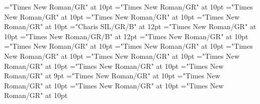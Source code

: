 \documentclass[gps1,twoside]{article}
\begin{document}
\font\variantentrytypevariantentrytypevariantentrytypesvisiblevariantentryrefvisiblevariantentryrefsminorentrycomplexbefore="Times New Roman/GR" at 10pt
\font\variantentrytypesvisiblevariantentryrefvisiblevariantentryrefsminorentrycomplexafter="Times New Roman/GR" at 10pt
\font\spanspanabbreviationvariantentrytypevariantentrytypesvisiblevariantentryrefvisiblevariantentryrefsminorentrycomplexbefore="Times New Roman/GR" at 10pt
\font\spanabbreviationvariantentrytypevariantentrytypesvisiblevariantentryrefvisiblevariantentryrefsminorentrycomplexlastchildafter="Times New Roman/GR" at 10pt
\font{}="Times New Roman/GR" at 10pt
\font\spanbzhheadwordreferencedentryreferencedentriesvisiblevariantentryrefvisiblevariantentryrefsminorentrycomplex="Charis SIL/GR/B" at 12pt
\font\spanspanheadwordreferencedentryreferencedentriesvisiblevariantentryrefvisiblevariantentryrefsminorentrycomplexbefore="Times New Roman/GR" at 10pt
\font\spanheadwordreferencedentryreferencedentriesvisiblevariantentryrefvisiblevariantentryrefsminorentrycomplex="Times New Roman/GR/B" at 12pt
\font\spanspandefinitionorglossreferencedentryreferencedentriesvisiblevariantentryrefvisiblevariantentryrefsminorentrycomplexbefore="Times New Roman/GR" at 10pt
\font\spandefinitionorglossreferencedentryreferencedentriesvisiblevariantentryrefvisiblevariantentryrefsminorentrycomplexfirstchildbefore="Times New Roman/GR" at 10pt
\font\spanspansummaryvisiblevariantentryrefvisiblevariantentryrefsminorentrycomplexbefore="Times New Roman/GR" at 10pt
\font\spansummaryvisiblevariantentryrefvisiblevariantentryrefsminorentrycomplexfirstchildbefore="Times New Roman/GR" at 10pt
\font\spanspancomplexformentryrefsminorentrycomplexbefore="Times New Roman/GR" at 10pt
\font\complexformentryrefsminorentrycomplexbefore="Times New Roman/GR" at 10pt
\font\complexformentryrefsminorentrycomplexafter="Times New Roman/GR" at 10pt
\font\complexformtypecomplexformtypecomplexformtypescomplexformentryrefcomplexformentryrefsminorentrycomplexbefore="Times New Roman/GR" at 9pt
\font\complexformtypescomplexformentryrefcomplexformentryrefsminorentrycomplexafter="Times New Roman/GR" at 10pt
\font\spanspanabbreviationcomplexformtypecomplexformtypescomplexformentryrefcomplexformentryrefsminorentrycomplexbefore="Times New Roman/GR" at 10pt
\font\spanabbreviationcomplexformtypecomplexformtypescomplexformentryrefcomplexformentryrefsminorentrycomplexlastchildafter="Times New Roman/GR" at 10pt
\font{}="Times New Roman/GR" at 10pt
\end{document}

